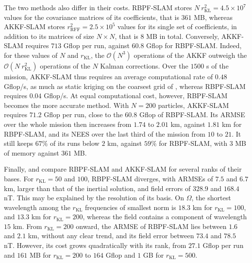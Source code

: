 The two methods also differ in their costs. RBPF-SLAM stores $N\:r_{\mathrm{KL}}^2=4.5\times10^7$ values for the covariance matrices of its coefficients, that is $361$ MB, whereas AKKF-SLAM stores $r_{\mathrm{RFF}}^2=2.5\times10^5$ values for its single set of coefficients, in addition to its matrices of size $N\times N$, that is $8$ MB in total. Conversely, AKKF-SLAM requires $713$ Gflop per run, against $60.8$ Gflop for RBPF-SLAM. Indeed, for these values of $N$ and $r_{\mathrm{KL}}$, the $\mathcal{O}\left(N^3\right)$ operations of the AKKF outweigh the $\mathcal{O}\left(N\:r_{\mathrm{KL}}^2\right)$ operations of the $N$ Kalman corrections. Over the $1500$ s of the mission, AKKF-SLAM thus requires an average computational rate of $0.48$ Gflop/s, as much as static kriging on the coarsest grid of , whereas RBPF-SLAM requires $0.04$ Gflop/s. At equal computational cost, however, RBPF-SLAM becomes the more accurate method. With $N=200$ particles, AKKF-SLAM requires $71.2$ Gflop per run, close to the $60.8$ Gflop of RBPF-SLAM. Its ARMSE over the whole mission then increases from $1.74$ to $2.01$ km, against $1.81$ km for RBPF-SLAM, and its NEES over the last third of the mission from $10$ to $21$. It still keeps $67\%$ of its runs below $2$ km, against $59\%$ for RBPF-SLAM, with $3$ MB of memory against $361$ MB.

Finally,  and  compare RBPF-SLAM and AKKF-SLAM for several ranks of their bases. For $r_{\mathrm{KL}}=50$ and $100$, RBPF-SLAM diverges, with ARMSEs of $7.5$ and $6.7$ km, larger than that of the inertial solution, and field errors of $328.9$ and $168.4$ nT. This may be explained by the resolution of its basis. On $\Omega$, the shortest wavelength among the $r_{\mathrm{KL}}$ frequencies of smallest norm is $18.3$ km for $r_{\mathrm{KL}}=100$, and $13.3$ km for $r_{\mathrm{KL}}=200$, whereas the field contains a component of wavelength $15$ km. From $r_{\mathrm{KL}}=200$ onward, the ARMSE of RBPF-SLAM lies between $1.6$ and $2.1$ km, without any clear trend, and its field error between $73.4$ and $78.5$ nT. However, its cost grows quadratically with its rank, from $27.1$ Gflop per run and $161$ MB for $r_{\mathrm{KL}}=200$ to $164$ Gflop and $1$ GB for $r_{\mathrm{KL}}=500$.


